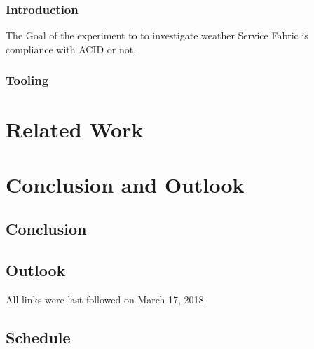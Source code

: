 \documentclass[a4paper,10pt,titlepage]{report}
\begin{document}
\subsection{Introduction}

The Goal of the experiment to to investigate weather Service Fabric is compliance with ACID or not,


\subsection{Tooling}




\chapter{Related Work}

\chapter{Conclusion and Outlook}
\section*{Conclusion}

\section*{Outlook}

All links were last followed on March 17, 2018.



\newpage
\appendix


\section{Schedule}

\end{document}
